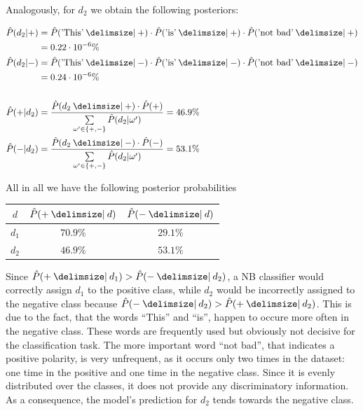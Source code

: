 Analogously, for $d_2$ we obtain the following posteriors:

\begin{equation*}
\begin{split}
\hat{P}(d_2|+) &=  \hat{P}(\text{'This'} \given +) \cdot \hat{P}(\text{'is'} \given +) \cdot \hat{P}(\text{'not bad'} \given
+)\\ &= 0.22 \cdot 10^{-6} \% \\
\hat{P}(d_2|-) &=  \hat{P}(\text{'This'} \given -) \cdot \hat{P}(\text{'is'} \given -) \cdot \hat{P}(\text{'not bad'} \given
-) \\ &= 0.24 \cdot 10^{-6} \% \\
\\
\hat{P}(+|d_2) &= \frac{\hat{P}(d_2 \given +)\cdot \hat{P}(+)}{\sum\limits_{\omega' \in \{+,-\}}
\hat{P}(d_2 | \omega')} = 46.9 \% \\
\hat{P}(-|d_2) &= \frac{\hat{P}(d_2 \given -)\cdot
\hat{P}(-)}{\sum\limits_{\omega' \in \{+,-\}} \hat{P}(d_2 | \omega')} = 53.1 \%
\end{split}
\end{equation*}

All in all we have the following posterior probabilities

\begin{center}
\begin{tabular}{c|c|c}
$d$ & $\hat{P}(+ \given d)$ & $\hat{P}(- \given d)$ \\
\hline
$d_1$ & $70.9 \%$ & $29.1 \%$ \\
$d_2$ & $46.9 \%$ & $53.1 \%$ \\
\end{tabular}
\end{center}

Since $\hat{P}(+ \given d_1) > \hat{P}(- \given d_2)$, a NB classifier
would correctly assign $d_1$ to the positive class, while $d_2$ would be
incorrectly assigned to the negative class because $\hat{P}(- \given d_2) >
\hat{P}(+ \given d_2)$. This is due to the fact, that the words ``This'' and
``is'', happen to occure more often in the negative class. These words are frequently
used but obviously not decisive for the classification task. The more important
word ``not bad'', that indicates a positive polarity, is very unfrequent, as it occurs only two
times in the dataset: one time in the positive and one time in the negative
class. Since it is evenly distributed over the classes, it does not provide any
discriminatory information. As a consequence, the model's
prediction for $d_2$ tends towards the negative class.

